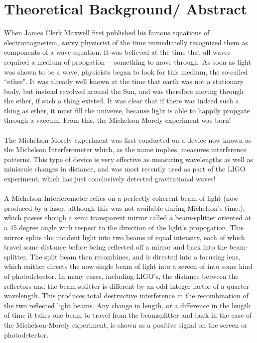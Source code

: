 \documentclass{amsart}
\begin{document}
\section{Theoretical Background/ Abstract}
When James Clerk Maxwell first published his famous equations of electromagnetism, savvy physicsist of the time immediatelly recognized them as components of a wave equation. It was believed at the time that all waves required a medium of propgation\---- something to move through. As soon as light was shown to be a wave, physicists began to look for this medium, the so-called ``ether". It was already well known at the time that earth was not a stationary body, but instead revolved around the Sun, and was therefore moving through the ether, if such a thing existed. It was clear that if there was indeed such a thing as ether, it must fill the universe, because light is able to happily propgate through a vaccum. From this, the Michelson-Morely experiment was born! \\ \\
The Michelson-Morely experiment was first conducted on a device now known as the Michelson Interferometer which, as the name implies, measures interference patterns. This type of device is very effective as measuring wavelengths as well as miniscule changes in distance, and was most recently used as part of the LIGO experiment, which has just conclusively detected gravitational waves! \\ \\
A Michelson Interferometer relies on a perfectly coherent beam of light (now produced by a laser, although this was not available during Michelson's time.), which passes though a semi transparent mirror called a beam-splitter oriented at a 45 degree angle with respect to the direction of the light's propogation. This mirror splits the incident light into two beams of equal intensity, each of which travel some distance before being reflected off a mirror and back into the beam-splitter. The split beam then recombines, and is directed into a focusing lens, which eaither directs the now single beam of light into a screen of into some kind of photodetector. In many cases, including LIGO's, the distance between the reflectors and the beam-splitter is different by an odd integer factor of a quarter wavelength. This produces total destructive interference in the recombination of the two reflected light beams. Any change in length, or a difference in the length of time it takes one beam to travel from the beamsplitter and back in the case of the Michelson-Morely experiment, is shown as a positive signal on the screen or photodetector. \\
\end{document}
